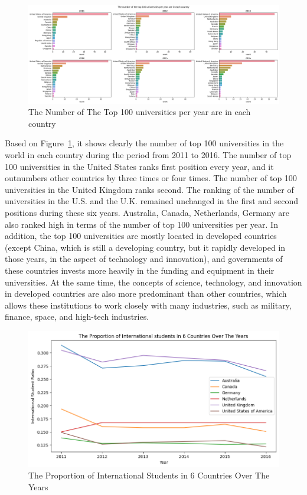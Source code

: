 \documentclass[a4paper]{article}
\begin{document}
\FloatBarrier
\begin{figure}[h]
  \centering
  \includegraphics[width=1.0\textwidth]{images/HPlot1.png}
  \caption{The Number of The Top 100 universities per year are in each country}
  \label{fig:4}
\end{figure}
\FloatBarrier
Based on Figure~\ref{fig:4}, it shows clearly the number of top 100 universities in the world in each country during the period from 2011 to 2016. The number of top 100 universities in the United States ranks first position every year, and it outnumbers other countries by three times or four times. The number of top 100 universities in the United Kingdom ranks second. The ranking of the number of universities in the U.S. and the U.K. remained unchanged in the first and second positions during these six years. Australia, Canada, Netherlands, Germany are also ranked high in terms of the number of top 100 universities per year. In addition, the top 100 universities are mostly located in developed countries (except China, which is still a developing country, but it rapidly developed in those years, in the aspect of technology and innovation), and governments of these countries invests more heavily in the funding and equipment in their universities. At the same time, the concepts of science, technology, and innovation in developed countries are also more predominant than other countries, which allows these institutions to work closely with many industries, such as military, finance, space, and high-tech industries. 
\FloatBarrier
\begin{figure}[h]
  \centering
  \includegraphics[scale=0.6]{images/HPlot2.png}
  \caption{The Proportion of International Students in 6 Countries Over The Years}
  \label{fig:5}
\end{figure}
\end{document}
